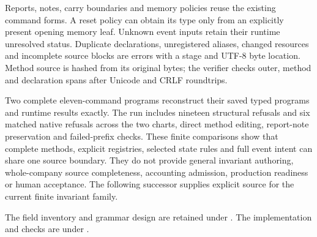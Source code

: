 Reports, notes, carry boundaries and memory policies reuse the existing command
forms. A reset policy can obtain its type only from an explicitly present
opening memory leaf. Unknown event inputs retain their runtime unresolved
status. Duplicate declarations, unregistered aliases, changed resources and
incomplete source blocks are errors with a stage and UTF-8 byte location.
Method source is hashed from its original bytes; the
verifier checks outer, method and declaration spans after Unicode and CRLF
roundtrips.

Two complete eleven-command programs reconstruct their saved typed programs
and runtime results exactly. The run includes nineteen structural refusals and
six matched native refusals across the two charts, direct method editing,
report-note preservation and failed-prefix checks. These finite comparisons
show that complete methods, explicit registries, selected state rules and full
event intent can share one source boundary. They do not provide general
invariant authoring, whole-company source completeness, accounting admission,
production readiness or human acceptance. The following successor supplies
explicit source for the current finite invariant family.

\begingroup\raggedright
The field inventory and grammar design are retained under
.
The implementation and checks are under
.

\par
\endgroup


